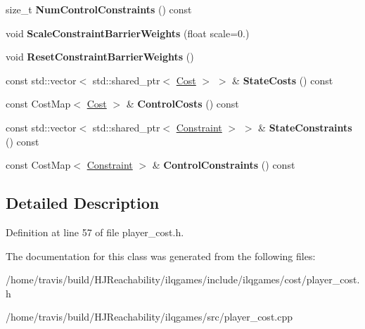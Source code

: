 \begin{DoxyCompactItemize}
\item 
size\+\_\+t {\bfseries Num\+Control\+Constraints} () const \hypertarget{classilqgames_1_1_player_cost_a61ab18fcd64b4fb99014ef14178f61d1}{}\label{classilqgames_1_1_player_cost_a61ab18fcd64b4fb99014ef14178f61d1}

\item 
void {\bfseries Scale\+Constraint\+Barrier\+Weights} (float scale=0.)\hypertarget{classilqgames_1_1_player_cost_a01099622def541cf226c94140c38d485}{}\label{classilqgames_1_1_player_cost_a01099622def541cf226c94140c38d485}

\item 
void {\bfseries Reset\+Constraint\+Barrier\+Weights} ()\hypertarget{classilqgames_1_1_player_cost_add7445e01947fcaaf9d5f1e392471970}{}\label{classilqgames_1_1_player_cost_add7445e01947fcaaf9d5f1e392471970}

\item 
const std\+::vector$<$ std\+::shared\+\_\+ptr$<$ \hyperlink{classilqgames_1_1_cost}{Cost} $>$ $>$ \& {\bfseries State\+Costs} () const \hypertarget{classilqgames_1_1_player_cost_adfb1861f05ba2efa163e7a28670f0585}{}\label{classilqgames_1_1_player_cost_adfb1861f05ba2efa163e7a28670f0585}

\item 
const Cost\+Map$<$ \hyperlink{classilqgames_1_1_cost}{Cost} $>$ \& {\bfseries Control\+Costs} () const \hypertarget{classilqgames_1_1_player_cost_a4fa0717c227acf2773deda56eaf62e99}{}\label{classilqgames_1_1_player_cost_a4fa0717c227acf2773deda56eaf62e99}

\item 
const std\+::vector$<$ std\+::shared\+\_\+ptr$<$ \hyperlink{classilqgames_1_1_constraint}{Constraint} $>$ $>$ \& {\bfseries State\+Constraints} () const \hypertarget{classilqgames_1_1_player_cost_ac6ef894e71fd9524bd6aa6d3982f415a}{}\label{classilqgames_1_1_player_cost_ac6ef894e71fd9524bd6aa6d3982f415a}

\item 
const Cost\+Map$<$ \hyperlink{classilqgames_1_1_constraint}{Constraint} $>$ \& {\bfseries Control\+Constraints} () const \hypertarget{classilqgames_1_1_player_cost_acf0081bb561f71522cd9716a9e34eb60}{}\label{classilqgames_1_1_player_cost_acf0081bb561f71522cd9716a9e34eb60}

\end{DoxyCompactItemize}


\subsection{Detailed Description}


Definition at line 57 of file player\+\_\+cost.\+h.



The documentation for this class was generated from the following files\+:\begin{DoxyCompactItemize}
\item 
/home/travis/build/\+H\+J\+Reachability/ilqgames/include/ilqgames/cost/player\+\_\+cost.\+h\item 
/home/travis/build/\+H\+J\+Reachability/ilqgames/src/player\+\_\+cost.\+cpp\end{DoxyCompactItemize}
